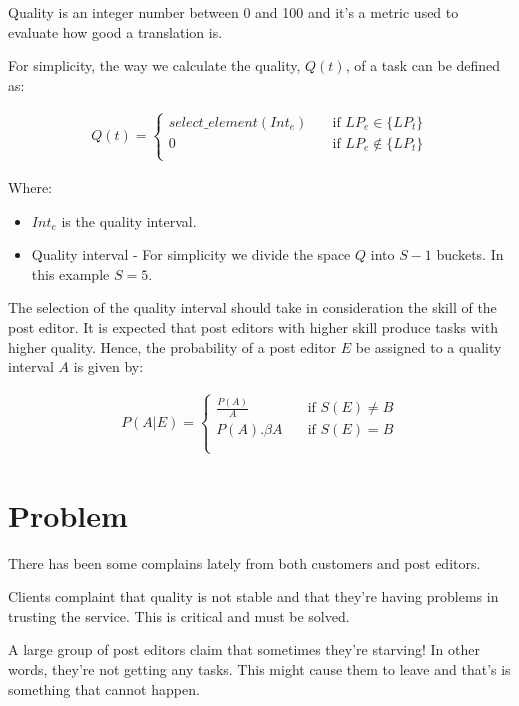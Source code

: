 \documentclass[]{extarticle}
\begin{document}
Quality is an integer number between 0 and 100 and it's a metric used to evaluate how good a translation is. 

For simplicity, the way we calculate the quality, $Q(t)$, of a task can be defined as:

\begin{align}
Q(t) =
  \begin{cases}
    select\_element(Int_e)      & \quad \text{if } LP_e \in \{LP_t\}  \\
    0  & \quad \text{if } LP_e \notin \{LP_t\}  \\
  \end{cases}
\end{align}

Where:

\begin{itemize}
\item $Int_e$ is the quality interval. 
\item Quality interval - For simplicity we divide the space $Q$ into $S-1$ buckets. In this example $S=5$.
\end{itemize}

The selection of the quality interval should take in consideration the skill of the post editor. It is expected that post editors with higher skill produce tasks with higher quality. Hence, the probability of a post editor $E$ be assigned to a quality interval $A$ is given by:


\begin{align}
P(A | E) =
  \begin{cases}
    \frac{P(A)}{A}      & \quad \text{if } S(E) \neq B  \\
    P(A) . \beta A         & \quad \text{if } S(E) = B  \\  \\
  \end{cases}
\end{align}


\section{Problem}

There has been some complains lately from both customers and post editors. 

Clients complaint that quality is not stable and that they're having problems in trusting the service. This is critical and must be solved.

A large group of post editors claim that sometimes they're starving! In other words, they're not getting any tasks. This might cause them to leave and that's is something that cannot happen.
\end{document}
